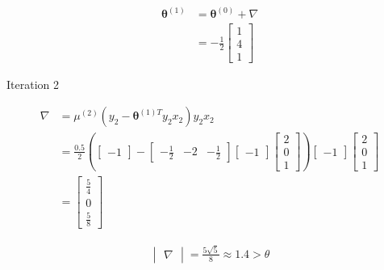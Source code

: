 \documentclass[a4paper, 10pt, twoside]{article}
\begin{document}
\begin{enumerate}[a)]
          \begin{align*}
              \bm{\theta}^{(1)}
               & = \bm{\theta}^{(0)} + \nabla \\
               & = -\frac{1}{2}
              \begin{bmatrix}
                  1 \\ 4 \\ 1
              \end{bmatrix}
          \end{align*}

          Iteration 2

          \begin{align*}
              \nabla
               & =
              \mu^{(2)}(y_2-\bm{\theta}^{(1)T}y_2x_2)y_2x_2 \\
               & =
              \frac{0.5}{2}
              \left(
              \begin{bmatrix}
                      -1
                  \end{bmatrix}
              -
              \begin{bmatrix}
                      -\frac{1}{2} & -2 & -\frac{1}{2}
                  \end{bmatrix}
              \begin{bmatrix}
                      -1
                  \end{bmatrix}
              \begin{bmatrix}
                      2 \\ 0 \\ 1
                  \end{bmatrix}
              \right)
              \begin{bmatrix}
                  -1
              \end{bmatrix}
              \begin{bmatrix}
                  2 \\ 0 \\ 1
              \end{bmatrix}                    \\
               & =
              \begin{bmatrix}
                  \frac{5}{4} \\ 0 \\ \frac{5}{8}
              \end{bmatrix}
          \end{align*}

          \begin{align*}
              \begin{vmatrix}
                  \nabla
              \end{vmatrix} = \frac{5\sqrt{5}}{8} \approx 1.4 > \theta
          \end{align*}


\end{enumerate}
\end{document}

